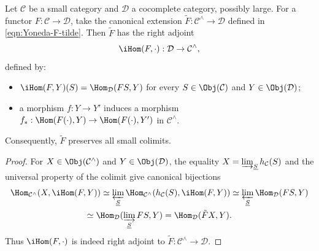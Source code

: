 \begin{proposition}\label{prop:Yoneda-F-tilde}
	Let $\mathcal{C}$ be a small category and $\mathcal{D}$ a cocomplete category, possibly large. For a functor $F:\mathcal{C}\to\mathcal{D}$, take the canonical extension
	$\tilde F:\mathcal{C}^\wedge\to\mathcal{D}$ defined in
	\eqref{eqn:Yoneda-F-tilde}. Then $\tilde F$ has the right adjoint
	\[ \iHom(F, \cdot): \mathcal{D} \to \mathcal{C}^\wedge , \]
	defined by:
	\begin{itemize}
		\item $\iHom(F,Y)(S)=\Hom_{\mathcal{D}}(FS,Y)$ for every
		$S\in\Obj(\mathcal{C})$ and $Y\in\Obj(\mathcal{D})$;
		\item a morphism $f:Y\to Y'$ induces a morphism
		$f_*:\Hom(F(\mathord\cdot),Y)\to\Hom(F(\mathord\cdot),Y')$ in $\mathcal{C}^\wedge$.
	\end{itemize}
	Consequently, $\tilde F$ preserves all small colimits.
\end{proposition}
\begin{proof}
	For $X\in\Obj(\mathcal{C}^\wedge)$ and $Y\in\Obj(\mathcal{D})$, the equality
	$X=\varinjlim_{\underline S}h_{\mathcal{C}}(S)$ and the universal property of the colimit give canonical bijections
	\begin{multline*}
		\Hom_{\mathcal{C}^\wedge}(X, \iHom(F, Y)) \simeq \varprojlim_{\underline{S}} \Hom_{\mathcal{C}^\wedge}(h_{\mathcal{C}}(S), \iHom(F, Y)) \simeq \varprojlim_{\underline{S}} \Hom_{\mathcal{D}}(FS, Y) \\
		\simeq \Hom_{\mathcal{D}}(\varinjlim_{\underline{S}} FS, Y ) = \Hom_{\mathcal{D}}(\tilde{F}X, Y).
	\end{multline*}
	Thus $\iHom(F,\mathord\cdot)$ is indeed right adjoint to
	$\tilde F:\mathcal{C}^\wedge\to\mathcal{D}$.
\end{proof}
